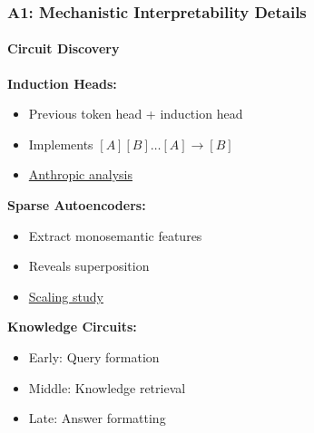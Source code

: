 \documentclass[10pt,aspectratio=169]{beamer}
\begin{document}

\begin{frame}
\frametitle{A1: Mechanistic Interpretability Details}
\framesubtitle{Circuit Discovery}

\textbf{Induction Heads:}
\begin{itemize}
    \item Previous token head + induction head
    \item Implements $[A][B] \ldots [A] \rightarrow [B]$
    \item \href{run:./papers/transformer_circuits_monosemantic_2023.md}{\color{blue}Anthropic analysis}
\end{itemize}

\vspace{0.5cm}
\textbf{Sparse Autoencoders:}
\begin{itemize}
    \item Extract monosemantic features
    \item Reveals superposition
    \item \href{run:./papers/transformer_circuits_scaling_2024.md}{\color{blue}Scaling study}
\end{itemize}

\vspace{0.5cm}
\textbf{Knowledge Circuits:}
\begin{itemize}
    \item Early: Query formation
    \item Middle: Knowledge retrieval
    \item Late: Answer formatting
\end{itemize}
\end{frame}
\end{document}
